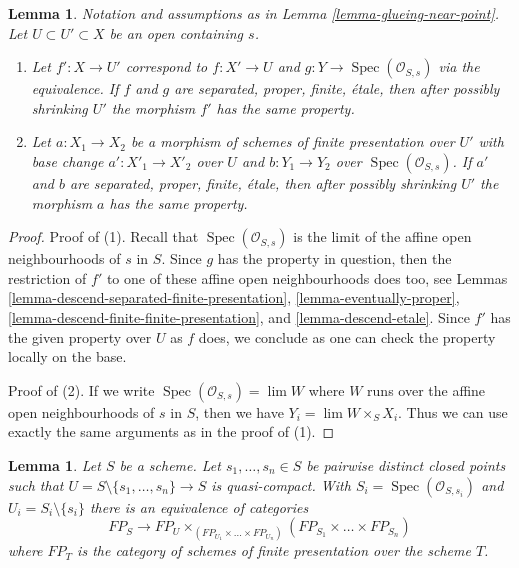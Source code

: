\documentclass{stacks-project}
\theoremstyle{plain}
\newtheorem{lemma}[subsection]{Lemma}
\theoremstyle{definition}
\theoremstyle{remark}
\numberwithin{equation}{subsection}
\def\lim{\mathop{\mathrm{lim}}\nolimits}
\def\Spec{\mathop{\mathrm{Spec}}}
\begin{document}
\begin{lemma}
\label{lemma-glueing-near-point-properties}
Notation and assumptions as in Lemma \ref{lemma-glueing-near-point}.
Let $U \subset U' \subset X$ be an open containing $s$.
\begin{enumerate}
\item  Let $f' : X \to U'$ correspond to $f : X' \to U$ and
$g : Y \to \Spec(\mathcal{O}_{S, s})$
via the equivalence. If $f$ and $g$ are separated, proper, finite, \'etale,
then after possibly shrinking $U'$ the morphism $f'$ has the same property.
\item Let $a : X_1 \to X_2$
be a morphism of schemes of finite presentation over $U'$
with base change $a' : X'_1 \to X'_2$ over $U$ and
$b : Y_1 \to Y_2$ over $\Spec(\mathcal{O}_{S, s})$.
If $a'$ and $b$ are separated, proper, finite, \'etale,
then after possibly shrinking $U'$ the morphism $a$ has the same property.
\end{enumerate}
\end{lemma}

\begin{proof}
Proof of (1). Recall that $\Spec(\mathcal{O}_{S, s})$ is the limit of the
affine open neighbourhoods of $s$ in $S$. Since $g$ has the property
in question, then the restriction of $f'$ to one of these
affine open neighbourhoods does too, see
Lemmas \ref{lemma-descend-separated-finite-presentation},
\ref{lemma-eventually-proper},
\ref{lemma-descend-finite-finite-presentation}, and
\ref{lemma-descend-etale}.
Since $f'$ has the given property over $U$ as $f$ does,
we conclude as one can check the property locally on the base.

\medskip\noindent
Proof of (2). If we write $\Spec(\mathcal{O}_{S, s}) = \lim W$
where $W$ runs over the affine open neighbourhoods of $s$ in $S$,
then we have $Y_i = \lim W \times_S X_i$. Thus we can use
exactly the same arguments as in the proof of (1).
\end{proof}

\begin{lemma}
\label{lemma-glueing-near-multiple-closed-points}
Let $S$ be a scheme. Let $s_1, \ldots, s_n \in S$ be pairwise distinct
closed points such that
$U = S \setminus \{s_1, \ldots, s_n\} \to S$ is quasi-compact. With
$S_i = \Spec(\mathcal{O}_{S, s_i})$ and $U_i = S_i \setminus \{s_i\}$
there is an equivalence of categories
$$
FP_S \longrightarrow
FP_U \times_{(FP_{U_1} \times \ldots \times FP_{U_n})}
(FP_{S_1} \times \ldots \times FP_{S_n})
$$
where $FP_T$ is the category of schemes of finite presentation over
the scheme $T$.
\end{lemma}
\end{document}
